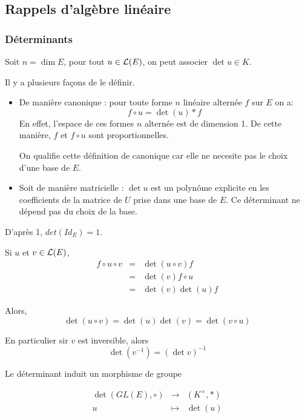 \subsection{Rappels d'algèbre linéaire}



\subsubsection{Déterminants} %


Soit $n = \dim E$, pour tout $u \in \mathcal{L}(E)$, on peut associer $\det u \in K$.

Il y a plusieurs façons de le définir.


\begin{itemize}
	\item De manière canonique : pour toute forme $n$ linéaire alternée $f$ sur $E$ on a:
	      $$ f \circ u = \det (u) * f$$
	      En effet, l'espace de ces formes $n$ alternée est de dimension 1. De cette manière, $f$ et $f \circ u$ sont proportionnelles.

	      On qualifie cette définition de canonique car elle ne necesite pas le choix d'une base de $E$.

	\item Soit de manière matricielle : $\det u$ est un polynôme explicite en les coefficients de la matrice de $U$ prise dans une base de $E$.
	      Ce déterminant ne dépend pas du choix de la base.
\end{itemize}


D'après 1, $det (Id_E) = 1$.

Si $u$ et $v \in \mathcal{L}(E)$,
\begin{eqnarray*}
	f \circ u \circ v &=& \det (u \circ v) f \\
	&=& \det (v) f  \circ u \\
	&=& \det (v) \det (u) f
\end{eqnarray*}

Alors,
$$\det (u \circ v) = \det (u) \det (v) = \det (v \circ u) $$

En particulier sir $v$ est inversible, alors
$$ \det (v^{-1}) = (\det v )^{-1} $$

Le déterminant induit un morphisme de groupe


\begin{eqnarray*}
	\det (GL(E), \circ) &\to& (K^{\times}, *)\\
	u &\mapsto& \det (u)
\end{eqnarray*}

